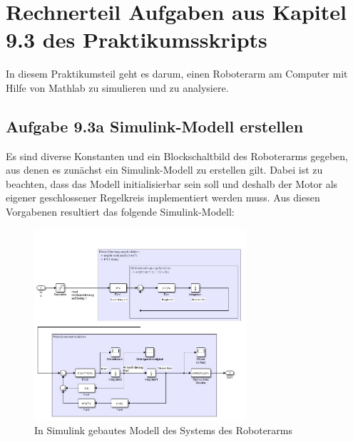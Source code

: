 \documentclass[10pt]{scrartcl}
\begin{document}











\section{Rechnerteil Aufgaben aus Kapitel 9.3 des Praktikumsskripts}
In diesem Praktikumsteil geht es darum, einen Roboterarm am Computer mit Hilfe von Mathlab zu simulieren und zu analysiere. 
\subsection{Aufgabe 9.3a Simulink-Modell erstellen}
Es sind diverse Konstanten und ein Blockschaltbild des Roboterarms gegeben, aus denen es zunächst ein Simulink-Modell zu erstellen gilt. Dabei ist zu beachten, dass das Modell initialisierbar sein soll und deshalb der Motor als eigener geschlossener Regelkreis implementiert werden muss. Aus diesen Vorgabenen resultiert das folgende Simulink-Modell:
\begin{figure}[H]
	\centering
	\includegraphics[width=0.7\textwidth]{Theoretischer Teil/SimulinkModell.jpeg}
	\caption{In Simulink gebautes Modell des Systems des Roboterarms}
	\label{img:grafik-dummy}
\end{figure}
\end{document}
